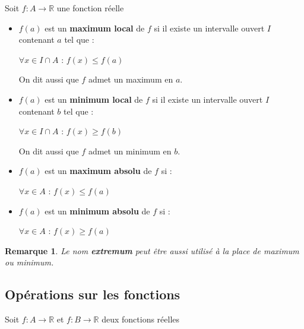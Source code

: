 \documentclass[12pt, a4paper]{book}
\newtheorem*{remarque}{Remarque}
\begin{document}
Soit $f : A \rightarrow \mathbb{R}$ une fonction réelle
\begin{itemize}
    \item  $f(a)$ est un \textbf{maximum local} de $f$ si il existe un intervalle ouvert $I$ contenant $a$ tel que :
    \begin{center}
        $\forall x \in I \cap A$ : $f(x) \leq f(a)$
    \end{center} 
    On dit aussi que $f$ admet un maximum en $a$.

    \item  $f(a)$ est un \textbf{minimum local} de $f$ si il existe un intervalle ouvert $I$ contenant $b$ tel que :
    \begin{center}
        $\forall x \in I \cap A$ : $f(x) \geq f(b)$
    \end{center} 
    On dit aussi que $f$ admet un minimum en $b$.

    \item  $f(a)$ est un \textbf{maximum absolu} de $f$ si :
    \begin{center}
        $\forall x \in A$ : $f(x) \leq f(a)$
    \end{center} 

    \item  $f(a)$ est un \textbf{minimum absolu} de $f$ si :
    \begin{center}
        $\forall x \in A$ : $f(x) \geq f(a)$
    \end{center} 
    
    
\end{itemize}
\begin{remarque}
    Le nom \textbf{extremum} peut être aussi utilisé à la place de maximum ou minimum.
\end{remarque}
\newpage

\subsection{Opérations sur les fonctions}
Soit $f : A \rightarrow \mathbb{R}$ et $f : B \rightarrow \mathbb{R}$ deux fonctions réelles
\end{document}
